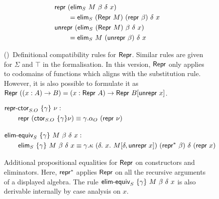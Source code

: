 \begin{figure}[H]
\begin{minipage}[t]{0.5\textwidth}
\begin{align*}
  & \textsf{repr}\ (\textsf{elim}_S\ M\ \beta\ \delta\ x) \\ &\qquad = \textsf{elim}_S\ (\textsf{Repr}\ M)\ (\textsf{repr}\ \beta)\ \delta\ x \\
  & \textsf{unrepr}\ (\textsf{elim}_S\ (\textsf{Repr}\ M)\ \beta\ \delta\ x)\\ &\qquad = \textsf{elim}_S\ M\ (\textsf{unrepr}\ \beta)\ \delta\ x
  \end{align*}
  \end{minipage}%
  \caption{()\
  Definitional compatibility rules for $\textsf{Repr}$. Similar rules are given for
  $\Sigma$ and $\top$ in the formalisation. In this version, $\textsf{Repr}$ only applies to codomains
  of functions which aligns with the substitution rule. However, it is also
  possible to formulate it as \\ $\textsf{Repr}\ ((x : A) \to B) = (x : \textsf{Repr}\ A) \to \textsf{Repr}\ B[\textsf{unrepr}\ x]$.}
  \label{fig:lambdaind-repr-coherence-pi-univ}
\end{figure}

\begin{figure}[H]
\vspace{2em}
  \begin{align*}
  & \mta{repr-ctor}_{S.O}\ \{\gamma\}\ \nu : \\ & \qquad \Mrepr\ (\Mctor_{S.O}\ \{\gamma\} \nu) \equiv \gamma.\alpha_O\ (\Mrepr\ \nu) \\[1em]
  & \mta{elim-equiv}_{S}\ \{\gamma\}\ M\ \beta\ \delta\ x :  \\ & \qquad
  \mta{elim}_{S}\ \{\gamma\}\ M\ \beta\ \delta\ x \equiv \gamma.\kappa\ (\delta.\ x.\ M[\delta, \Munrepr\ x])\ (\Mrepr^*\ \beta)\ \delta\ (\Mrepr\ x)
  \end{align*}
  \caption{Additional propositional equalities for $\textsf{Repr}$ on constructors and eliminators. Here, $\textsf{repr}^*$ applies $\textsf{Repr}$ on all the recursive
    arguments of a displayed algebra. The rule $\mta{elim-equiv}_{S}\ \{\gamma\}\ M\ \beta\ \delta\ x$ is also derivable internally by case analysis
    on $x$.}
\end{figure}
